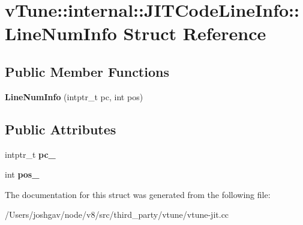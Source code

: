 \hypertarget{structv_tune_1_1internal_1_1_j_i_t_code_line_info_1_1_line_num_info}{}\section{v\+Tune\+:\+:internal\+:\+:J\+I\+T\+Code\+Line\+Info\+:\+:Line\+Num\+Info Struct Reference}
\label{structv_tune_1_1internal_1_1_j_i_t_code_line_info_1_1_line_num_info}
\subsection*{Public Member Functions}
\begin{DoxyCompactItemize}
\item 
{\bfseries Line\+Num\+Info} (intptr\+\_\+t pc, int pos)\hypertarget{structv_tune_1_1internal_1_1_j_i_t_code_line_info_1_1_line_num_info_a83d2e696265c73ad76b8c597d86c41bf}{}\label{structv_tune_1_1internal_1_1_j_i_t_code_line_info_1_1_line_num_info_a83d2e696265c73ad76b8c597d86c41bf}

\end{DoxyCompactItemize}
\subsection*{Public Attributes}
\begin{DoxyCompactItemize}
\item 
intptr\+\_\+t {\bfseries pc\+\_\+}\hypertarget{structv_tune_1_1internal_1_1_j_i_t_code_line_info_1_1_line_num_info_acfd81b9456b26f913fecd704b98cb048}{}\label{structv_tune_1_1internal_1_1_j_i_t_code_line_info_1_1_line_num_info_acfd81b9456b26f913fecd704b98cb048}

\item 
int {\bfseries pos\+\_\+}\hypertarget{structv_tune_1_1internal_1_1_j_i_t_code_line_info_1_1_line_num_info_ac756fd703dc80d68800f0dac32db7094}{}\label{structv_tune_1_1internal_1_1_j_i_t_code_line_info_1_1_line_num_info_ac756fd703dc80d68800f0dac32db7094}

\end{DoxyCompactItemize}


The documentation for this struct was generated from the following file\+:\begin{DoxyCompactItemize}
\item 
/\+Users/joshgav/node/v8/src/third\+\_\+party/vtune/vtune-\/jit.\+cc\end{DoxyCompactItemize}
